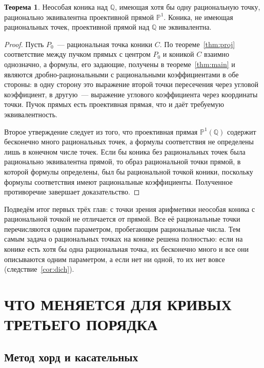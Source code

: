 \documentclass[a4paper,14pt]{extreport}
\theoremstyle{definition}
\newtheorem{thm}{Теорема}[chapter]
\newcommand{\Q}{\mathbb{Q}}
\newcommand{\PP}{\mathbb{P}}
\begin{document}
\begin{thm}\label{thm:equiv}
Неособая коника над $\Q$, имеющая хотя бы одну рациональную точку, рационально
эквивалентна проективной прямой $\PP^1$. Коника, не имеющая рациональных точек,
проективной прямой над $\Q$ не эквивалентна.
\end{thm}

\begin{proof}
Пусть $P_0$~--- рациональная точка коники $C$. По теореме~\ref{thm:proj}
соответствие между пучком прямых с центром $P_0$ и коникой $C$ взаимно
однозначно, а формулы, его задающие, получены в теореме~\ref{thm:main} и
являются дробно-рациональными с рациональными коэффициентами в обе стороны: в
одну сторону это выражение второй точки пересечения через угловой коэффициент,
в другую~--- выражение углового коэффициента через координаты точки. Пучок
прямых есть проективная прямая, что и даёт требуемую эквивалентность.

Второе утверждение следует из того, что проективная прямая $\PP^1(\Q)$ содержит
бесконечно много рациональных точек, а формулы соответствия не определены лишь
в конечном числе точек. Если бы коника без рациональных точек была рационально
эквивалентна прямой, то образ рациональной точки прямой, в которой формулы
определены, был бы рациональной точкой коники, поскольку формулы соответствия
имеют рациональные коэффициенты. Полученное противоречие завершает
доказательство.
\end{proof}

Подведём итог первых трёх глав: с точки зрения арифметики неособая коника с рациональной точкой не отличается от прямой. Все её
рациональные точки перечисляются одним параметром, пробегающим рациональные
числа. Тем самым задача о рациональных точках на конике решена полностью: если
на конике есть хотя бы одна рациональная точка, их бесконечно много и все они
описываются одним параметром, а если нет ни одной, то их нет вовсе
(следствие~\ref{cor:dich}).

\chapter{ЧТО МЕНЯЕТСЯ ДЛЯ КРИВЫХ ТРЕТЬЕГО ПОРЯДКА}

\section{Метод хорд и касательных}
\end{document}
